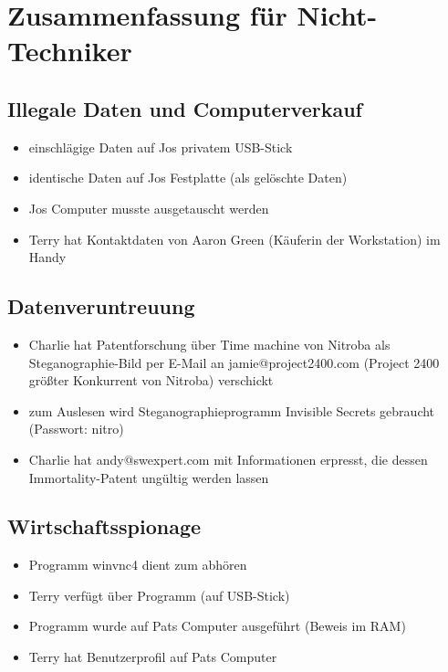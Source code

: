 \chapter{Zusammenfassung für Nicht-Techniker}
\label{sec:nicht_tec}

\section{Illegale Daten und Computerverkauf}
\label{sec:illegale_daten}
\begin{itemize}
	\item einschlägige Daten auf Jos privatem USB-Stick
	\item identische Daten auf Jos Festplatte (als gelöschte Daten)
	\item Jos Computer musste ausgetauscht werden
	\item Terry hat Kontaktdaten von Aaron Green (Käuferin der Workstation) im Handy
\end{itemize}

\section{Datenveruntreuung}
\label{sec:veruntreuung}
\begin{itemize}
	\item Charlie hat Patentforschung über Time machine von Nitroba als Steganographie-Bild per E-Mail an jamie@project2400.com (Project 2400 größter Konkurrent von Nitroba) verschickt
	\item zum Auslesen wird Steganographieprogramm Invisible Secrets gebraucht (Passwort: nitro)
	\item Charlie hat andy@swexpert.com mit Informationen erpresst, die dessen Immortality-Patent ungültig werden lassen
\end{itemize}

\section{Wirtschaftsspionage}
\label{sec:spionage}
\begin{itemize}
	\item Programm winvnc4 dient zum abhören
	\item Terry verfügt über Programm (auf USB-Stick)
	\item Programm wurde auf Pats Computer ausgeführt (Beweis im RAM)
	\item Terry hat Benutzerprofil auf Pats Computer
\end{itemize}

